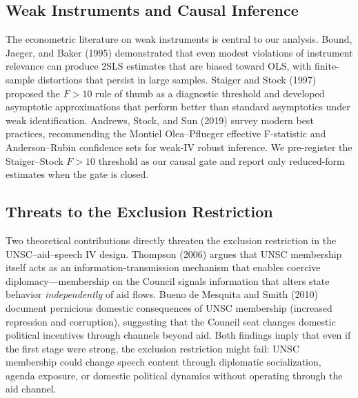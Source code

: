 \subsection{Weak Instruments and Causal Inference}

The econometric literature on weak instruments is central to our analysis. Bound, Jaeger, and Baker (1995) demonstrated that even modest violations of instrument relevance can produce 2SLS estimates that are biased toward OLS, with finite-sample distortions that persist in large samples. Staiger and Stock (1997) proposed the $F>10$ rule of thumb as a diagnostic threshold and developed asymptotic approximations that perform better than standard asymptotics under weak identification. Andrews, Stock, and Sun (2019) survey modern best practices, recommending the Montiel Olea--Pflueger effective F-statistic and Anderson--Rubin confidence sets for weak-IV robust inference. We pre-register the Staiger--Stock $F>10$ threshold as our causal gate and report only reduced-form estimates when the gate is closed.

\subsection{Threats to the Exclusion Restriction}

Two theoretical contributions directly threaten the exclusion restriction in the UNSC--aid--speech IV design. Thompson (2006) argues that UNSC membership itself acts as an information-transmission mechanism that enables coercive diplomacy---membership on the Council signals information that alters state behavior \emph{independently} of aid flows. Bueno de Mesquita and Smith (2010) document pernicious domestic consequences of UNSC membership (increased repression and corruption), suggesting that the Council seat changes domestic political incentives through channels beyond aid. Both findings imply that even if the first stage were strong, the exclusion restriction might fail: UNSC membership could change speech content through diplomatic socialization, agenda exposure, or domestic political dynamics without operating through the aid channel.
